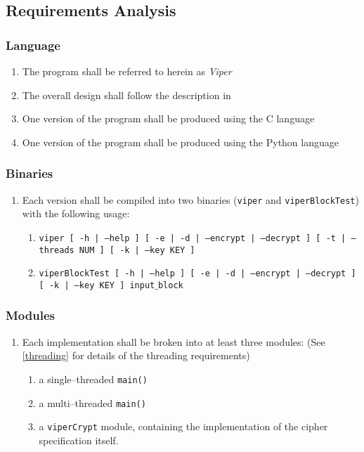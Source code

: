 \subsection{Requirements Analysis}
\label{requirements}
\subsubsection{Language}
\begin{enumerate}
\item The program shall be referred to herein as \emph{Viper}
\item The overall design shall follow the description in \cite{submission}
\item One version of the program shall be produced using the C language
\item One version of the program shall be produced using the Python language
\end{enumerate}

\subsubsection{Binaries}
\begin{enumerate}
\item Each version shall be compiled into two binaries (\texttt{viper} and \texttt{viperBlockTest}) with the following usage:
	\begin{enumerate}
	\item \texttt{viper [ -h | --help ]  [ -e | -d | --encrypt | --decrypt ] [ -t | --threads NUM ] [ -k | --key KEY ]}
	\item \texttt{viperBlockTest [ -h | --help ]  [ -e | -d | --encrypt | --decrypt ] [ -k | --key KEY ] input$\_$block}
	\end{enumerate}
\end{enumerate}

\subsubsection{Modules}
\begin{enumerate}
\item Each implementation shall be broken into at least three modules: (See \ref{threading} for details of the threading requirements)
	\begin{enumerate}
	\item a single--threaded \texttt{main()}
	\item a multi--threaded \texttt{main()}
	\item a \texttt{viperCrypt} module, containing the implementation of the cipher specification itself.
	\end{enumerate}
\end{enumerate}

